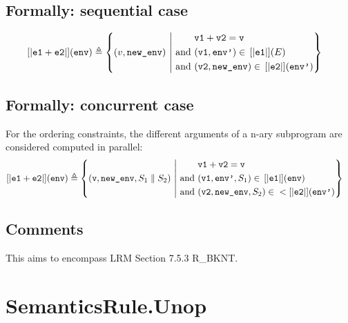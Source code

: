 \documentclass{book}
\begin{document}
\begin{formal}
  \subsection{Formally: sequential case}

  \begin{align}
  \left[| \texttt{e1} + \texttt{e2} \right|] (\texttt{env}) & \triangleq
    \left\{ (v, \texttt{new\_env}) \ \middle|\ {}
    \begin{aligned}
      & \texttt{v1} + \texttt{v2} = \texttt{v}
      \\ \text{and}\ &
      (\texttt{v1}, \texttt{env'}) \in{} \left[| \texttt{e1} \right|] (E)
      \\ \text{and}\ &
      (\texttt{v2}, \texttt{new\_env}) \in{} \left[| \texttt{e2} \right|] (\texttt{env'})
    \end{aligned}
    \right\}
  \label{eq:sem-seq-plus}
  \end{align}

  \subsection{Formally: concurrent case}
  For the ordering constraints, the different arguments of a n-ary subprogram
are considered computed in parallel:
  \begin{align}
    \left[| \texttt{e1} + \texttt{e2} \right|] (\texttt{env}) & \triangleq
    \left\{ (\texttt{v}, \texttt{new\_env}, S_1 \parallel S_2) \ \middle|\ {}
    \begin{aligned}
      & \texttt{v1} + \texttt{v2} = \texttt{v}
      \\ \text{and}\ &
      (\texttt{v1}, \texttt{env'}, S_1) \in{} \left[| \texttt{e1} \right|] (\texttt{env})
      \\ \text{and}\ &
      (\texttt{v2}, \texttt{new\_env}, S_2) \in{} <\left[| \texttt{e2} \right|] (\texttt{env'})
    \end{aligned}
    \right\}
  \label{eq:sem-conc-plus}
  \end{align}
\end{formal}

\subsection{Comments}
  This aims to encompass LRM Section 7.5.3 R\_BKNT.

\section{SemanticsRule.Unop \label{sec:SemanticsRule.Unop}}
\end{document}
